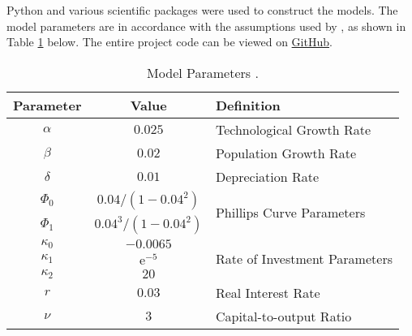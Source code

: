 \documentclass[12pt, centerh1]{article}
\begin{document}
Python \citep{rossum1995python} and various scientific packages were used to construct the models. The model parameters are in accordance with the assumptions used by \citet{grasselli2012analysis}, as shown in Table \ref{tab:parameters} below. The entire project code can be viewed on \href{https://github.com/grantwforsythe/math3mb3}{GitHub}.
\begin{table}[!h]
\caption{Model Parameters \citep{grasselli2012analysis}.}
\label{tab:parameters}
\centering
\begin{tabular}{|c|c|l|}
\hline
\textbf{Parameter }     & \textbf{Value}            & \textbf{Definition}                       \\
\hline\hline
$\alpha$                & $0.025$                   & Technological Growth Rate                 \\
$\beta$                 & $0.02$                    & Population Growth Rate                    \\
$\delta$                & $0.01$                    & Depreciation Rate                 \\ \hline
$\Phi_0$                & $0.04/(1-0.04^2)$         & \multirow{2}{*}{Phillips Curve Parameters}\\
$\Phi_1$                & $0.04^3/(1-0.04^2)$       & ~                                 \\ \hline
$\kappa_0$             & $-0.0065$                 & \multirow{3}{*}{Rate of Investment Parameters}   \\
$\kappa_1$              & $\mathrm e^{-5}$          & ~                                         \\
$\kappa_2$              & $20$                      & ~                                 \\ \hline
$r$                     & $0.03$                    & Real Interest Rate                        \\
$\nu$                   & $3$                       & Capital-to-output Ratio                   \\
\hline
\end{tabular}
\end{table}
\end{document}

